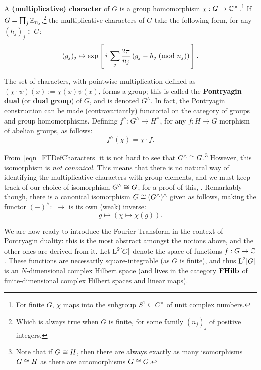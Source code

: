 A \textbf{(multiplicative) character} of $G$ is a group homomorphism $\chi:G\to \mathbb{C}^\times$.\footnote{For finite $G$, $\chi$ maps into the subgroup $S^1 \subseteq C^\times$ of unit complex numbers.} If $G = \prod_j \mathbb{Z}_{n_j}$,\footnote{Which is always true when $G$ is finite, for some family $(n_j)_j$ of positive integers.} the multiplicative characters of $G$ take the following form, for any $(h_j)_j \in G$:
\begin{equation}\label{eqn_FTDefCharacters}
  (g_j)_j \mapsto \exp\left[\, i \, \sum_j \frac{2 \pi}{n_j} \left(g_j-h_j \; (\text{mod } n_j)\right) \, \right].
\end{equation}

The set of characters, with pointwise multiplication defined as $(\chi\cdot\psi)(x):=\chi(x)\psi(x)$, forms a group; this is called the \textbf{Pontryagin dual} (or \textbf{dual group}) of $G$, and is denoted $G^\wedge$. In fact, the Pontryagin construction can be made (contravariantly) functorial on the category  of groups and group homomorphisms. Defining $f^\wedge : G^\wedge \rightarrow H^\wedge$, for any $f: H \rightarrow G$ morphism of abelian groups, as follows:
\begin{equation*}
  f^\wedge( \chi ) = \chi \cdot f.
\end{equation*}

From~\eqref{eqn_FTDefCharacters} it is not hard to see that $G^\wedge \cong G$.\footnote{Note that if $G \cong H$, then there are always exactly as many isomorphisms $G \cong H$ as there are automorphisms $G \cong G$.} However, this isomorphism is \emph{not canonical}. This means that there is no natural way of identifying the multiplicative characters with group elements, and we must keep track of our choice of isomorphism $G^\wedge \cong G$; for a proof of this, . Remarkably though, there is a canonical isomorphism $G \cong (G^\wedge)^\wedge$ given as follows, making the functor $(-)^{\wedge}:$  $\to$  is its own (weak) inverse:
\begin{equation*}
  g \mapsto (\chi \mapsto \chi(g)).
\end{equation*}

\newcommand{\FourierTransformSym}[1]{\mathcal{F}_{#1}}
\newcommand{\InverseFourierTransformSym}[1]{\mathcal{F}_{#1}^{-1}}
\newcommand{\FourierTransform}[1]{\mathcal{F}_G[#1]}
\newcommand{\InverseFourierTransform}[1]{\mathcal{F}_G^{-1}[#1]}

We are now ready to introduce the Fourier Transform in the context of Pontryagin duality: this is the most abstract amongst the notions above, and the other ones are derived from it. Let $\operatorname{L}^2[G]$ denote the space of functions $f:G\to \mathbb{C}$. These functions are necessarily square-integrable (as $G$ is finite), and thus $\operatorname{L}^2[G]$ is an $N$-dimensional complex Hilbert space (and lives in the category $\mathbf{FHilb}$ of finite-dimensional complex Hilbert spaces and linear maps). 


